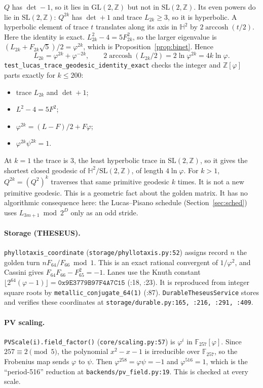 \documentclass[11pt]{article}
\theoremstyle{definition}
\newcommand{\Z}{\mathbb{Z}}
\newcommand{\GL}{\mathrm{GL}}
\newcommand{\code}[1]{\texttt{\small #1}}
\begin{document}
$Q$ has $\det-1$, so it lies in $\GL(2,\Z)$ but not in $\mathrm{SL}(2,\Z)$. Its even powers do lie in
$\mathrm{SL}(2,\Z)$: $Q^{2k}$ has $\det+1$ and trace $L_{2k}\ge3$, so it is hyperbolic. A hyperbolic element of
trace $t$ translates along its axis in $\mathbb H^2$ by $2\operatorname{arccosh}(t/2)$. Here the identity is exact.
$L_{2k}^2-4=5F_{2k}^2$, so the larger eigenvalue is $(L_{2k}+F_{2k}\sqrt5)/2=\varphi^{2k}$, which is
Proposition~\ref{prop:binet}. Hence
\[ L_{2k}=\varphi^{2k}+\varphi^{-2k},\qquad 2\operatorname{arccosh}(L_{2k}/2)=2\ln\varphi^{2k}=4k\ln\varphi. \]
\code{test\_lucas\_trace\_geodesic\_identity\_exact} checks the integer and $\Z[\varphi]$ parts exactly for
$k\le200$:
\begin{itemize}
\item trace $L_{2k}$ and $\det+1$;
\item $L^2-4=5F^2$;
\item $\varphi^{2k}=(L-F)/2+F\varphi$;
\item $\varphi^{2k}\psi^{2k}=1$.
\end{itemize}
At $k=1$ the trace is 3, the least hyperbolic trace in $\mathrm{SL}(2,\Z)$, so it gives the shortest closed geodesic
of $\mathbb H^2/\mathrm{SL}(2,\Z)$, of length $4\ln\varphi$. For $k>1$, $Q^{2k}=(Q^2)^k$ traverses that same primitive
geodesic $k$ times. It is not a new primitive geodesic. This is a geometric fact about the golden matrix. It has no
algorithmic consequence here: the Lucas--Pisano schedule (Section~\ref{sec:sched}) uses $L_{3m+1}\bmod2^D$ only as an
odd stride.

\paragraph{Storage (THESEUS).} \code{phyllotaxis\_coordinate} (\code{storage/phyllotaxis.py:52}) assigns record $n$
the golden turn $nF_{64}/F_{66}\bmod1$. This is an exact rational convergent of $1/\varphi^2$, and Cassini gives
$F_{64}F_{66}-F_{65}^2=-1$. Lanes use the Knuth constant $\lfloor2^{64}(\varphi-1)\rfloor=\texttt{0x9E3779B97F4A7C15}$
(:18, :23). It is reproduced from integer square roots by \code{metallic\_conjugate\_64(1)} (:87).
\code{DurableTheseusService} stores and verifies these coordinates at \code{storage/durable.py:165, :216, :291, :409}.

\paragraph{PV scaling.} \code{PVScale(i).field\_factor()} (\code{core/scaling.py:57}) is $\varphi^i$ in
$\mathbb F_{257}[\varphi]$. Since $257\equiv2\pmod5$, the polynomial $x^2-x-1$ is irreducible over $\mathbb F_{257}$,
so the Frobenius map sends $\varphi$ to $\psi$. Then $\varphi^{258}=\varphi\psi=-1$ and $\varphi^{516}=1$, which is the
``period-516'' reduction at \code{backends/pv\_field.py:19}. This is checked at every scale.
\end{document}

